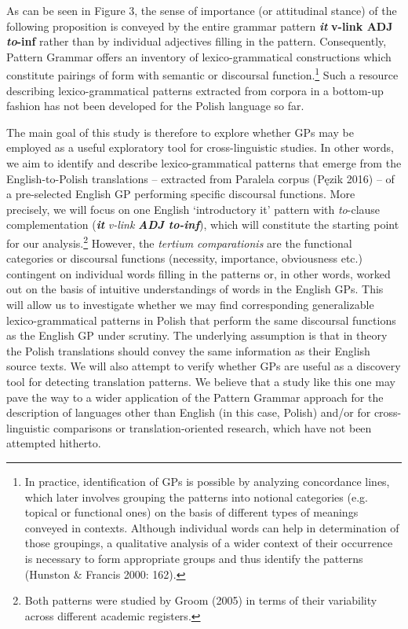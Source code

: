 \documentclass[12pt]{article}
\newenvironment{styleStandard}{\setlength\leftskip{0cm}\setlength\rightskip{0cm plus 1fil}\setlength\parindent{0cm}\setlength\parfillskip{0pt plus 1fil}\setlength\parskip{0in plus 1pt}\writerlistparindent\writerlistleftskip\leavevmode\normalfont\normalsize\writerlistlabel\ignorespaces}{\unskip\vspace{0.111in plus 0.0111in}\par}
\newcommand\writerlistleftskip{}
\newcommand\writerlistparindent{}
\newcommand\writerlistlabel{}
\begin{document}
\begin{styleStandard}
As can be seen in Figure 3, the sense of importance (or attitudinal stance) of the following proposition is conveyed by the entire grammar pattern \textbf{\textit{it}}\textbf{ v-link ADJ }\textbf{\textit{to}}\textbf{{}-inf} rather than by individual adjectives filling in the pattern. Consequently, Pattern Grammar offers an inventory of lexico-grammatical constructions which constitute pairings of form with semantic or discoursal function.\footnote{\textrm{In practice, identification of GPs is possible by analyzing concordance lines, which later involves grouping the patterns into notional categories (e.g. topical or functional ones) on the basis of different types of meanings conveyed in contexts. Although individual words can help in determination of those groupings, a qualitative analysis of a wider context of their occurrence is necessary to form appropriate groups and thus identify the patterns (Hunston \& Francis 2000: 162).}} Such a resource describing lexico-grammatical patterns extracted from corpora in a bottom-up fashion has not been developed for the Polish language so far. 
\end{styleStandard}

\begin{styleStandard}
The main goal of this study is therefore to explore whether GPs may be employed as a useful exploratory tool for cross-linguistic studies. In other words, we aim to identify and describe lexico-grammatical patterns that emerge from the English-to-Polish translations – extracted from Paralela corpus (Pęzik 2016) – of a pre-selected English GP performing specific discoursal functions. More precisely, we will focus on one English ‘introductory it’ pattern with \textit{to}{}-clause complementation (\textbf{\textit{it }}\textit{v-link}\textbf{\textit{ ADJ to-inf}}), which will constitute the starting point for our analysis.\footnote{\textrm{Both patterns were studied by Groom (2005) in terms of their variability across different academic registers.}} However, the \textit{tertium comparationis} are the functional categories or discoursal functions (necessity, importance, obviousness etc.) contingent on individual words filling in the patterns or, in other words, worked out on the basis of intuitive understandings of words in the English GPs. This will allow us to investigate whether we may find corresponding generalizable lexico-grammatical patterns in Polish that perform the same discoursal functions as the English GP under scrutiny. The underlying assumption is that in theory the Polish translations should convey the same information as their English source texts. We will also attempt to verify whether GPs are useful as a discovery tool for detecting translation patterns. We believe that a study like this one may pave the way to a wider application of the Pattern Grammar approach for the description of languages other than English (in this case, Polish) and/or for cross-linguistic comparisons or translation-oriented research, which have not been attempted hitherto. 
\end{styleStandard}
\end{document}
